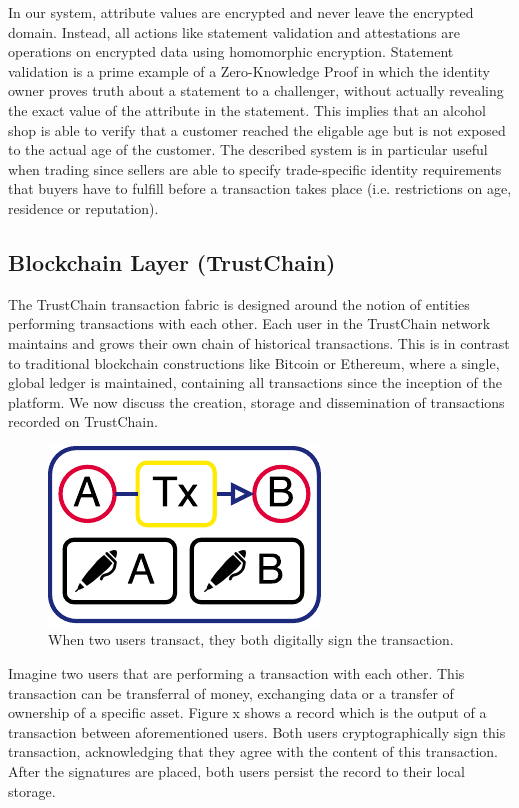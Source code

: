 \documentclass[USenglish]{article}
\begin{document}
In our system, attribute values are encrypted and never leave the encrypted domain.
Instead, all actions like statement validation and attestations are operations on encrypted data using homomorphic encryption.
Statement validation is a prime example of a Zero-Knowledge Proof in which the identity owner proves truth about a statement to a challenger, without actually revealing the exact value of the attribute in the statement.
This implies that an alcohol shop is able to verify that a customer reached the eligable age but is not exposed to the actual age of the customer.
The described system is in particular useful when trading since sellers are able to specify trade-specific identity requirements that buyers have to fulfill before a transaction takes place (i.e. restrictions on age, residence or reputation).

\subsection{Blockchain Layer (TrustChain)}

The TrustChain transaction fabric is designed around the notion of entities performing transactions with each other.
Each user in the TrustChain network maintains and grows their own chain of historical transactions. 
This is in contrast to traditional blockchain constructions like Bitcoin or Ethereum, where a single, global ledger is maintained, containing all transactions since the inception of the platform.
We now discuss the creation, storage and dissemination of transactions recorded on TrustChain.

\begin{figure}[h!]
	\centering
	\includegraphics[width=0.5\columnwidth]{assets/trustchain_tutorial_1}
	\caption{When two users transact, they both digitally sign the transaction.}
	\label{fig:trustchain_tutorial_1}
\end{figure}

Imagine two users that are performing a transaction with each other.
This transaction can be transferral of money, exchanging data or a transfer of ownership of a specific asset.
Figure x shows a record which is the output of a transaction between aforementioned users.
Both users cryptographically sign this transaction, acknowledging that they agree with the content of this transaction.
After the signatures are placed, both users persist the record to their local storage.
\end{document}
